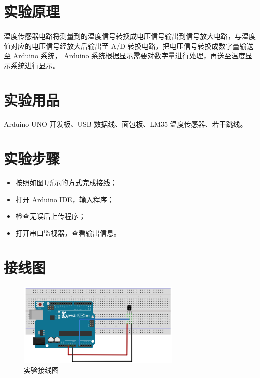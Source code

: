 \documentclass[UTF8, oneside]{ctexbook}
\begin{document}
\section{实验原理}
\paragraph{}
温度传感器电路将测量到的温度信号转换成电压信号输出到信号放大电路，与温度
值对应的电压信号经放大后输出至 A/D 转换电路，把电压信号转换成数字量输送至 Arduino 系统，
Arduino 系统根据显示需要对数字量进行处理，再送至温度显示系统进行显示。

\section{实验用品}
\paragraph{}
Arduino UNO 开发板、USB 数据线、面包板、LM35 温度传感器、若干跳线。

\section{实验步骤}
\begin{itemize}
    \item[(1)] 按照如图\ref{s10_line}所示的方式完成接线；
    \item[(2)] 打开 Arduino IDE，输入程序；
    \item[(3)] 检查无误后上传程序；
    \item[(4)] 打开串口监视器，查看输出信息。
\end{itemize}

\section{接线图}
\begin{figure}[h]
    \centering
    \includegraphics[width=0.7\textwidth]{./result/sensor/10/lines.png}
    \caption{实验接线图}
    \label{s10_line}
\end{figure}
\end{document}
